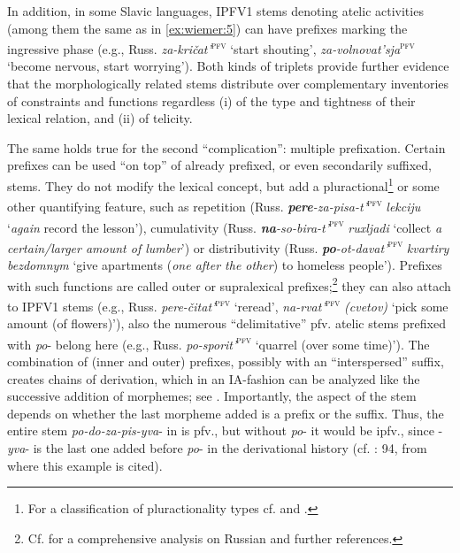 \documentclass[output=paper]{langscibook}
\begin{document}
\begin{sloppypar}
In addition, in some Slavic languages, IPFV1 stems denoting atelic activities (among them the same as in \ref{ex:wiemer:5}) can have prefixes marking the ingressive phase (e.g., Russ. \textit{za-kričat’}\textsc{\textsuperscript{pfv}} ‘start shouting’, \textit{za-volnovat’sja}\textsc{\textsuperscript{pfv}} ‘become nervous, start worrying’). Both kinds of triplets provide further evidence that the morphologically related stems distribute over complementary inventories of constraints and functions regardless (i) of the type and tightness of their lexical relation, and (ii) of telicity.
\end{sloppypar}

The same holds true for the second “complication”: multiple prefixation. Certain prefixes can be used “on top” of already prefixed, or even secondarily suffixed, stems. They do not modify the lexical concept, but add a pluractional\footnote{For a classification of pluractionality types cf. \citet{Sluinskij2006} and \citet{Wood2007}.} or some other quantifying feature, such as repetition (Russ. \textbf{\textit{pere}}\textit{{}-za-pisa-t’}\textsc{\textsuperscript{pfv}} \textit{lekciju} ‘\textit{again} record the lesson’), cumulativity (Russ. \textbf{\textit{na}}\textit{{}-so-bira-t’}\textsc{\textsuperscript{pfv}} \textit{ruxljadi} ‘collect \textit{a certain\slash larger amount of lumber}’) or distributivity (Russ. \textbf{\textit{po}}\textit{{}-ot-davat’}\textsc{\textsuperscript{pfv}} \textit{kvartiry bezdomnym} ‘give apartments (\textit{one after the other}) to homeless people’). Prefixes with such functions are called outer or supralexical prefixes;\footnote{Cf. \citet{Tatevosov2009} for a comprehensive analysis on Russian and further references.} they can also attach to IPFV1 stems (e.g., Russ. \textit{pere-čitat’}\textsc{\textsuperscript{pfv}} ‘reread’, \textit{na-rvat’}\textsc{\textsuperscript{pfv}} \textit{(cvetov)} ‘pick some amount (of flowers)’), also the numerous “delimitative” pfv. atelic stems prefixed with \textit{po}{}- belong here (e.g., Russ. \textit{po-sporit’}\textsc{\textsuperscript{pfv}} ‘quarrel (over some time)’). The combination of (inner and outer) prefixes, possibly with an “interspersed” suffix, creates chains of derivation, which in an IA-fashion can be analyzed like the successive addition of morphemes; see . Importantly, the aspect of the stem depends on whether the last morpheme added is a prefix or the suffix. Thus, the entire stem \textit{po-do-za-pis-yva}{}- in  is pfv., but without \textit{po}{}- it would be ipfv., since -\textit{yva}{}- is the last one added before \textit{po}{}- in the derivational history (cf. \citealt{Tatevosov2009}: 94, from where this example is cited).
\end{document}
